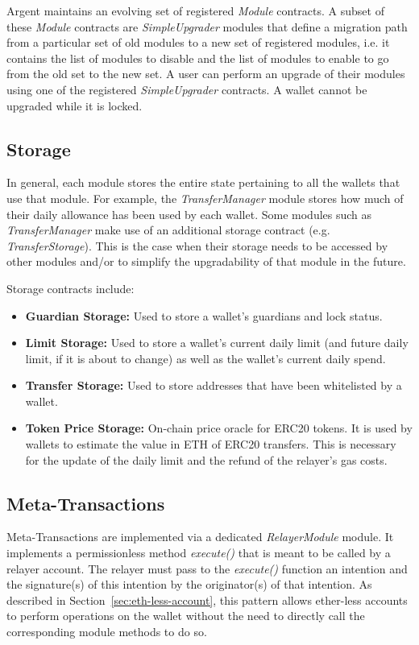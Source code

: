 \documentclass[12pt]{article}
\begin{document}
Argent maintains an evolving set of registered \emph{Module} contracts. A subset of these \emph{Module} contracts are \emph{SimpleUpgrader} modules that define a migration path from a particular set of old modules to a new set of registered modules, i.e. it contains the list of modules to disable and the list of modules to enable to go from the old set to the new set. A user can perform an upgrade of their modules using one of the registered \emph{SimpleUpgrader} contracts. A wallet cannot be upgraded while it is locked.


\subsection{Storage}
\label{sec:storage}
In general, each module stores the entire state pertaining to all the wallets that use that module. For example, the \emph{TransferManager} module stores how much of their daily allowance has been used by each wallet. Some modules such as \emph{TransferManager} make use of an additional storage contract (e.g. \emph{TransferStorage}). This is the case when their storage needs to be accessed by other modules and/or to simplify the upgradability of that module in the future.

Storage contracts include:
\begin{itemize}
\item \textbf{Guardian Storage:} Used to store a wallet's guardians and lock status.
\item \textbf{Limit Storage:} Used to store a wallet's current daily limit (and future daily limit, if it is about to change) as well as the wallet's current daily spend.
\item \textbf{Transfer Storage:} Used to store addresses that have been whitelisted by a wallet.
\item \textbf{Token Price Storage:} On-chain price oracle for ERC20 tokens. It is used by wallets to estimate the value in ETH of ERC20 transfers. This is necessary for the update of the daily limit and the refund of the relayer's gas costs. 
\end{itemize}

\subsection{Meta-Transactions}
\label{sec:meta-transactions}
Meta-Transactions are implemented via a dedicated \emph{RelayerModule} module. It implements a permissionless method \emph{execute()} that is meant to be called by a relayer account. The relayer must pass to the \emph{execute()} function an intention and the signature(s) of this intention by the originator(s) of that intention. As described in Section~\ref{sec:eth-less-account}, this pattern allows ether-less accounts to perform operations on the wallet without the need to directly call the corresponding module methods to do so.
\end{document}
